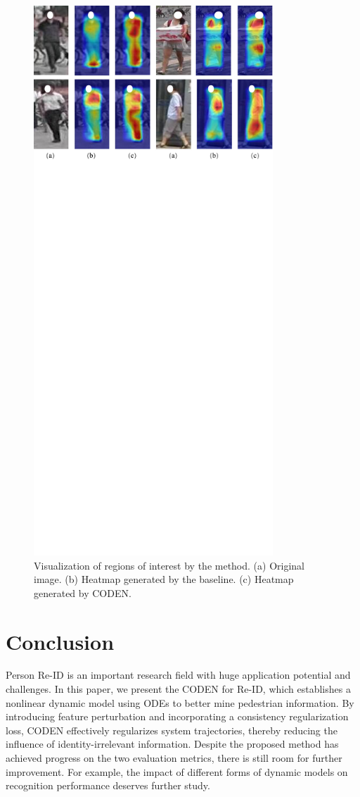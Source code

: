 \documentclass[12pt]{spieman}  %
\begin{document}
\begin{spacing}{2}
\begin{figure}[!htbp]
	\centering
	\includegraphics[width=9cm]{Figure_4}
	\caption{Visualization of regions of interest by the method. (a) Original image. (b) Heatmap generated by the baseline. (c) Heatmap generated by CODEN.}
	\label{fig:vis_heatmap}
\end{figure}

\section{Conclusion}
\label{section:conclusion}
Person Re-ID is an important research field with huge application potential and challenges. In this paper, we present the CODEN for Re-ID, which establishes a nonlinear dynamic model using ODEs to better mine pedestrian information. By introducing feature perturbation and incorporating a consistency regularization loss, CODEN effectively regularizes system trajectories, thereby reducing the influence of identity-irrelevant information. Despite the proposed method has achieved  progress on the two evaluation metrics, there is still room for further improvement. For example, the impact of different forms of dynamic models on recognition performance deserves further study.


\end{spacing}
\end{document}
